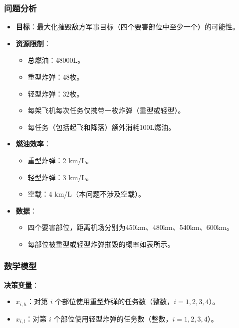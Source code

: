 \subsubsection{问题分析}
\begin{itemize}
    \item \textbf{目标}：最大化摧毁敌方军事目标（四个要害部位中至少一个）的可能性。
    \item \textbf{资源限制}：
        \begin{itemize}
            \item 总燃油：48000L。
            \item 重型炸弹：48枚。
            \item 轻型炸弹：32枚。
            \item 每架飞机每次任务仅携带一枚炸弹（重型或轻型）。
            \item 每任务（包括起飞和降落）额外消耗100L燃油。
        \end{itemize}
    \item \textbf{燃油效率}：
        \begin{itemize}
            \item 重型炸弹：2 km/L。
            \item 轻型炸弹：3 km/L。
            \item 空载：4 km/L（本问题不涉及空载）。
        \end{itemize}
    \item \textbf{数据}：
        \begin{itemize}
            \item 四个要害部位，距离机场分别为450km、480km、540km、600km。
            \item 每部位被重型或轻型炸弹摧毁的概率如表所示。
        \end{itemize}
\end{itemize}

\subsubsection{数学模型}

\textbf{决策变量}：
\begin{itemize}
    \item \( x_{i,h} \)：对第 \( i \) 个部位使用重型炸弹的任务数（整数，\( i = 1,2,3,4 \)）。
    \item \( x_{i,l} \)：对第 \( i \) 个部位使用轻型炸弹的任务数（整数，\( i = 1,2,3,4 \)）。
\end{itemize}

